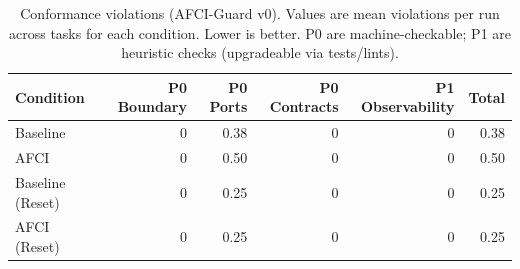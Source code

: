 \begin{table}[t]
\centering
\caption{Conformance violations (AFCI-Guard v0). Values are mean violations per run across tasks for each condition. Lower is better. P0 are machine-checkable; P1 are heuristic checks (upgradeable via tests/lints).}
\vspace{-2.5ex}
\label{tab:conformance}
\footnotesize
\setlength{\tabcolsep}{6pt}
\renewcommand{\arraystretch}{1.05}
\begin{tabular*}{\textwidth}{@{\extracolsep{\fill}}lrrrrr@{}}
\toprule
Condition & P0 Boundary & P0 Ports & P0 Contracts & P1 Observability & Total \\
\midrule
Baseline         & 0 & 0.38 & 0 & 0 & 0.38 \\
AFCI             & 0 & 0.50 & 0 & 0 & 0.50 \\
Baseline (Reset) & 0 & 0.25 & 0 & 0 & 0.25 \\
AFCI (Reset)     & 0 & 0.25 & 0 & 0 & 0.25 \\
\bottomrule
\end{tabular*}
\end{table}